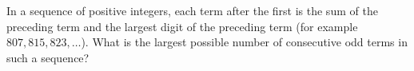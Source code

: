 In a sequence of positive integers, each term after the first is the sum of the preceding term and the largest digit of the preceding term (for example $807,815,823,\dots$). What is the largest possible number of consecutive odd terms in such a sequence?

